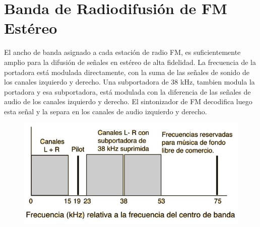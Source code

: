 \section{Banda de Radiodifusión de FM Estéreo}
El ancho de banda asignado a cada estación de radio FM, es
suficientemente amplio para la difusión de señales en estéreo de
alta fidelidad. La frecuencia de la portadora está modulada
directamente, con la suma de las señales de sonido de los canales
izquierdo y derecho. Una subportadora de 38 kHz, tambien modula la
portadora y esa subportadora, está modulada con la diferencia de
las señales de audio de los canales izquierdo y derecho. El
sintonizador de FM decodifica luego esta señal y la separa en
los canales de audio izquierdo y derecho.

\begin{figure}
    \begin{center}
        \includegraphics{contenido/img/ej6fig3.JPG}
    \end{center}
\end{figure}